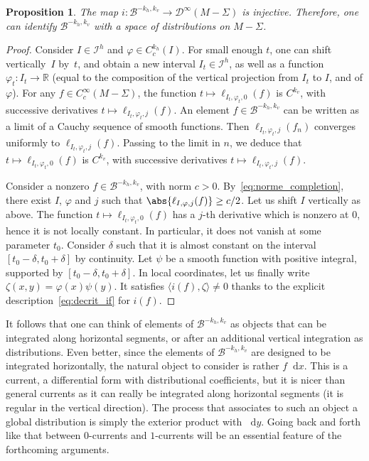 \documentclass[10pt]{amsart}
\newcommand{\boI}{\mathcal{I}}
\newcommand{\boB}{\mathcal{B}}
\newcommand{\boD}{\mathcal{D}}
\newcommand{\R}{\mathbb{R}}
\newcommand{\dd}{\mathop{}\!\mathrm{d}}
\let\phi\varphi
\newtheorem{prop}[thm]{Proposition}
\theoremstyle{definition}
\numberwithin{equation}{section}
\begin{document}
\begin{prop}
\label{prop:distrib} The map $i: \boB^{-k_h, k_v} \to \boD^\infty(M-\Sigma)$
is injective. Therefore, one can identify $\boB^{-k_h, k_v}$ with a space of
distributions on $M-\Sigma$.
\end{prop}
\begin{proof}
Consider $I \in \boI^h$ and $\phi \in C^{k_h}_c(I)$. For small enough $t$,
one can shift vertically~$I$ by~$t$, and obtain a new interval $I_t \in
\boI^h$, as well as a function $\phi_t:I_t \to \R$ (equal to the composition
of the vertical projection from $I_t$ to $I$, and of $\phi$). For any $f \in
C^\infty_c(M-\Sigma)$, the function $t \mapsto \ell_{I_t, \phi_t, 0}(f)$ is
$C^{k_v}$, with successive derivatives $t \mapsto \ell_{I_t, \phi_t, j}(f)$.
An element $f \in \boB^{-k_h, k_v}$ can be written as a limit of a Cauchy
sequence of smooth functions. Then $\ell_{I_t, \phi_t, j}(f_n)$ converges
uniformly to $\ell_{I_t, \phi_t, j}(f)$. Passing to the limit in $n$, we
deduce that $t \mapsto \ell_{I_t, \phi_t, 0}(f)$ is $C^{k_v}$, with
successive derivatives $t \mapsto \ell_{I_t, \phi_t, j}(f)$.

Consider a nonzero $f \in \boB^{-k_h, k_v}$, with norm $c>0$.
By~\eqref{eq:norme_completion}, there exist $I$, $\phi$ and $j$ such that
$\abs{\ell_{I,\phi,j}(f)} \geq c/2$. Let us shift $I$ vertically as above.
The function $t \mapsto \ell_{I_t, \phi_t, 0}(f)$ has a $j$-th derivative
which is nonzero at $0$, hence it is not locally constant. In particular, it
does not vanish at some parameter $t_0$. Consider $\delta$ such that it is
almost constant on the interval $[t_0-\delta, t_0+\delta]$ by continuity. Let
$\psi$ be a smooth function with positive integral, supported by
$[t_0-\delta, t_0+\delta]$. In local coordinates, let us finally write
$\zeta(x,y)= \phi(x) \psi(y)$. It satisfies $\langle i(f), \zeta \rangle \neq
0$ thanks to the explicit description~\eqref{eq:decrit_if} for $i(f)$.
\end{proof}

It follows that one can think of elements of $\boB^{-k_h, k_v}$ as objects
that can be integrated along horizontal segments, or after an additional
vertical integration as distributions. Even better, since the elements of
$\boB^{-k_h, k_v}$ are designed to be integrated horizontally, the natural
object to consider is rather $f\dd x$. This is a current, \ie a
differential form with distributional coefficients, but it is nicer than
general currents as it can really be integrated along horizontal segments
(\ie it is regular in the vertical direction). The process that associates
to such an object a global distribution is simply the exterior product with
$\dd y$. Going back and forth like that between $0$-currents and $1$-currents
will be an essential feature of the forthcoming arguments.
\end{document}
